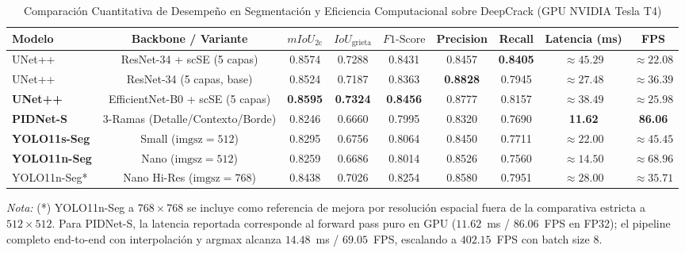 \documentclass[conference]{IEEEtran}
\begin{document}
\begin{table}[t]
\caption{Comparación Cuantitativa de Desempeño en Segmentación y Eficiencia Computacional sobre DeepCrack (GPU NVIDIA Tesla T4)}
\label{tab:results_comparison}
\begin{center}
\begin{tabular}{lcccccccc}
\toprule
\textbf{Modelo} & \textbf{Backbone / Variante} & \textbf{$mIoU_{\text{2c}}$} & \textbf{$IoU_{\text{grieta}}$} & \textbf{$F1\text{-Score}$} & \textbf{Precision} & \textbf{Recall} & \textbf{Latencia (ms)} & \textbf{FPS} \\
\midrule
UNet++ & ResNet-34 + scSE (5 capas) & 0.8574 & 0.7288 & 0.8431 & 0.8457 & \textbf{0.8405} & $\approx 45.29$ & $\approx 22.08$ \\
UNet++ & ResNet-34 (5 capas, base) & 0.8524 & 0.7187 & 0.8363 & \textbf{0.8828} & 0.7945 & $\approx 27.48$ & $\approx 36.39$ \\
\textbf{UNet++} & EfficientNet-B0 + scSE (5 capas) & \textbf{0.8595} & \textbf{0.7324} & \textbf{0.8456} & 0.8777 & 0.8157 & $\approx 38.49$ & $\approx 25.98$ \\
\midrule
\textbf{PIDNet-S} & 3-Ramas (Detalle/Contexto/Borde) & 0.8246 & 0.6660 & 0.7995 & 0.8320 & 0.7690 & \textbf{11.62} & \textbf{86.06} \\
\midrule
\textbf{YOLO11s-Seg} & Small ($\text{imgsz}=512$) & 0.8295 & 0.6756 & 0.8064 & 0.8450 & 0.7711 & $\approx 22.00$ & $\approx 45.45$ \\
\textbf{YOLO11n-Seg} & Nano ($\text{imgsz}=512$) & 0.8259 & 0.6686 & 0.8014 & 0.8526 & 0.7560 & $\approx 14.50$ & $\approx 68.96$ \\
YOLO11n-Seg* & Nano Hi-Res ($\text{imgsz}=768$) & 0.8438 & 0.7026 & 0.8254 & 0.8580 & 0.7951 & $\approx 28.00$ & $\approx 35.71$ \\
\bottomrule
\end{tabular}
\end{center}
\vspace{1ex}
\footnotesize{\textit{Nota:} (*) YOLO11n-Seg a $768\times 768$ se incluye como referencia de mejora por resolución espacial fuera de la comparativa estricta a $512\times 512$. Para PIDNet-S, la latencia reportada corresponde al forward pass puro en GPU ($11.62$~ms / $86.06$~FPS en FP32); el pipeline completo end-to-end con interpolación y argmax alcanza $14.48$~ms / $69.05$~FPS, escalando a $402.15$~FPS con batch size 8.}
\end{table}
\end{document}
